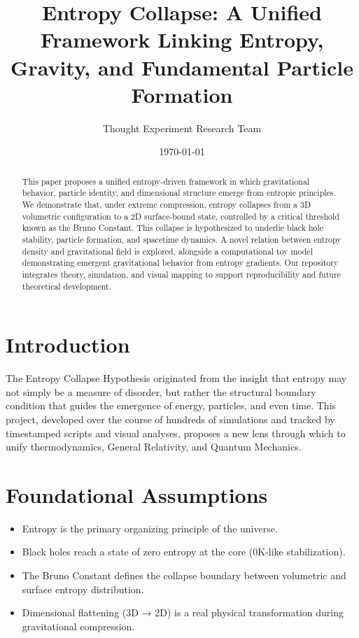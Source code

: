 \documentclass[12pt]{article}
\title{Entropy Collapse: A Unified Framework Linking Entropy, Gravity, and Fundamental Particle Formation}
\author{Thought Experiment Research Team}
\date{\today}
\begin{document}
\maketitle


\begin{abstract}
This paper proposes a unified entropy-driven framework in which gravitational behavior, particle identity, and dimensional structure emerge from entropic principles. We demonstrate that, under extreme compression, entropy collapses from a 3D volumetric configuration to a 2D surface-bound state, controlled by a critical threshold known as the Bruno Constant. This collapse is hypothesized to underlie black hole stability, particle formation, and spacetime dynamics. A novel relation between entropy density and gravitational field is explored, alongside a computational toy model demonstrating emergent gravitational behavior from entropy gradients. Our repository integrates theory, simulation, and visual mapping to support reproducibility and future theoretical development.
\end{abstract}


\tableofcontents

\section{Introduction}
The Entropy Collapse Hypothesis originated from the insight that entropy may not simply be a measure of disorder, but rather the structural boundary condition that guides the emergence of energy, particles, and even time. This project, developed over the course of hundreds of simulations and tracked by timestamped scripts and visual analyses, proposes a new lens through which to unify thermodynamics, General Relativity, and Quantum Mechanics.

\section{Foundational Assumptions}
\begin{itemize}
    \item Entropy is the primary organizing principle of the universe.
    \item Black holes reach a state of zero entropy at the core (0K-like stabilization).
    \item The Bruno Constant defines the collapse boundary between volumetric and surface entropy distribution.
    \item Dimensional flattening (3D → 2D) is a real physical transformation during gravitational compression.
\end{itemize}
\end{document}
